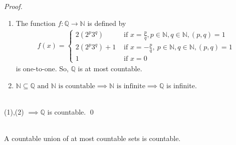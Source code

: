 \begin{proof}
    \begin{enumerate}[$(1)$]
        \item The function $f: \mathbb{Q} \rightarrow \mathbb{N}$ is defined by 
        \begin{align*}
            f(x)=\begin{cases} 2(2^p3^q) &\text{ if } x=\frac{p}{q}, p\in\mathbb{N},q\in\mathbb{N}, (p,q)=1 \\ 2(2^p3^q) +1 &\text{ if }x=-\frac{p}{q},~p\in\mathbb{N}, q\in \mathbb{N}, (p,q)=1 \\ 1 &\text{ if } x = 0
            \end{cases}
        \end{align*} is one-to-one. So, $\mathbb{Q}$ is at most countable. 
        \item $\mathbb{N} \subseteq \mathbb{Q} \text{ and }
            \mathbb{N} \text{ is countable} \implies \mathbb{N} \text{ is infinite} \implies \mathbb{Q}$ is infinite.
    \end{enumerate}
     \leavevmode \\ (1),(2) $\implies \mathbb{Q}$ is countable. \qed
\end{proof}

\begin{theorem} \leavevmode \\
    \label{thmB}
    A countable union of at most countable sets is countable.
\end{theorem}

